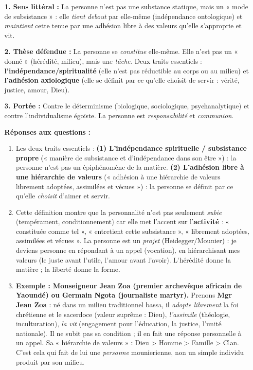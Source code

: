 \documentclass[11pt]{article}
\begin{document}
\begin{corrige}
\textbf{1. Sens littéral :} La personne n'est pas une substance statique, mais un « mode de subsistance » : elle \emph{tient debout} par elle-même (indépendance ontologique) et \emph{maintient} cette tenue par une adhésion libre à des valeurs qu'elle s'approprie et vit.
\par \textbf{2. Thèse défendue :} La personne se \emph{constitue} elle-même. Elle n'est pas un « donné » (hérédité, milieu), mais une \emph{tâche}. Deux traits essentiels : \textbf{l'indépendance/spiritualité} (elle n'est pas réductible au corps ou au milieu) et \textbf{l'adhésion axiologique} (elle se définit par ce qu'elle choisit de servir : vérité, justice, amour, Dieu).
\par \textbf{3. Portée :} Contre le déterminisme (biologique, sociologique, psychanalytique) et contre l'individualisme égoïste. La personne est \emph{responsabilité} et \emph{communion}.
\par \textbf{Réponses aux questions :}
\begin{enumerate}
\item Les deux traits essentiels : \textbf{(1) L'indépendance spirituelle / subsistance propre} (« manière de subsistance et d'indépendance dans son être ») : la personne n'est pas un épiphénomène de la matière. \textbf{(2) L'adhésion libre à une hiérarchie de valeurs} (« adhésion à une hiérarchie de valeurs librement adoptées, assimilées et vécues ») : la personne se définit par ce qu'elle \emph{choisit} d'aimer et servir.
\item Cette définition montre que la personnalité n'est pas seulement \emph{subie} (tempérament, conditionnement) car elle met l'accent sur l'\textbf{activité} : « constituée comme tel », « entretient cette subsistance », « librement adoptées, assimilées et vécues ». La personne est un \emph{projet} (Heidegger/Mounier) : je deviens personne en répondant à un appel (vocation), en hiérarchisant mes valeurs (le juste avant l'utile, l'amour avant l'avoir). L'hérédité donne la matière ; la liberté donne la forme.
\item \textbf{Exemple : Monseigneur Jean Zoa (premier archevêque africain de Yaoundé) ou Germain Ngota (journaliste martyr).} Prenons \textbf{Mgr Jean Zoa} : né dans un milieu traditionnel bassa, il \emph{adopte librement} la foi chrétienne et le sacerdoce (valeur suprême : Dieu), \emph{l'assimile} (théologie, inculturation), \emph{la vit} (engagement pour l'éducation, la justice, l'unité nationale). Il ne subit pas sa condition ; il en fait une réponse personnelle à un appel. Sa « hiérarchie de valeurs » : Dieu > Homme > Famille > Clan. C'est cela qui fait de lui une \emph{personne} mounierienne, non un simple individu produit par son milieu.
\end{enumerate}
\end{corrige}
\end{document}
